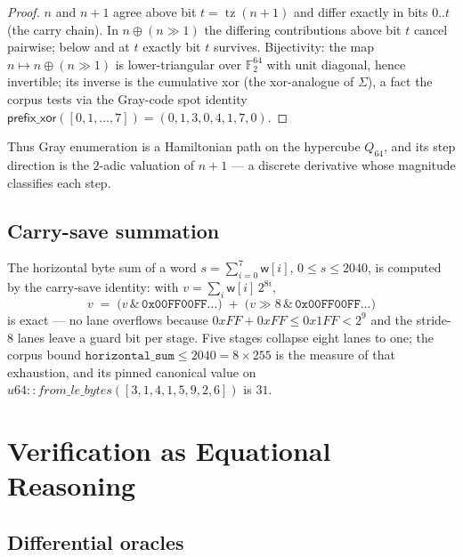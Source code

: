 \documentclass[11pt,a4paper]{report}
\newcommand{\FF}{\mathbb{F}}
\newcommand{\word}{\mathsf{w}}
\DeclareMathOperator{\tz}{tz}
\begin{document}
\begin{proof}
$n$ and $n+1$ agree above bit $t = \tz(n+1)$ and differ exactly in bits
$0..t$ (the carry chain). In $n \oplus (n\gg1)$ the differing
contributions above bit $t$ cancel pairwise; below and at $t$ exactly
bit $t$ survives. Bijectivity: the map $n \mapsto n \oplus (n \gg 1)$
is lower-triangular over $\FF_2^{64}$ with unit diagonal, hence
invertible; its inverse is the cumulative xor (the xor-analogue of
$\Sigma$), a fact the corpus tests via the Gray-code spot identity
$\mathsf{prefix\_xor}([0,1,\dots,7]) = (0,1,3,0,4,1,7,0)$.
\end{proof}

Thus Gray enumeration is a Hamiltonian path on the hypercube
$Q_{64}$, and its step direction is the $2$-adic valuation of $n+1$
--- a discrete derivative whose magnitude classifies each step.

\section{Carry-save summation}

The horizontal byte sum of a word
$s = \sum_{i=0}^{7} \word[i]$, $0 \le s \le 2040$, is computed by the
carry-save identity: with $v = \sum_i \word[i]\, 2^{8i}$,
\begin{equation}
v \;=\; \bigl(v \,\&\, \mathtt{0x00FF00FF\ldots}\bigr)
\;+\; \bigl(v \gg 8 \,\&\, \mathtt{0x00FF00FF\ldots}\bigr)
\end{equation}
is exact --- no lane overflows because $0xFF + 0xFF \le 0x1FF < 2^9$ and
the stride-8 lanes leave a guard bit per stage. Five stages collapse
eight lanes to one; the corpus bound $\mathtt{horizontal\_sum}
\le 2040 = 8 \times 255$ is the measure of that exhaustion, and its
pinned canonical value on
$u64{:}:from\_le\_bytes([3,1,4,1,5,9,2,6])$ is $31$.

\chapter{Verification as Equational Reasoning}

\section{Differential oracles}
\end{document}

